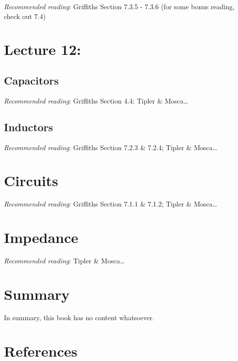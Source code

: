 \documentclass[
  letterpaper,
  DIV=11,
  numbers=noendperiod]{scrreprt}
\newlength{\cslhangindent}
\newenvironment{CSLReferences}[2] %
 {\begin{list}{}{%
  \setlength{\itemindent}{0pt}
  \setlength{\leftmargin}{0pt}
  \setlength{\parsep}{0pt}
  \ifodd #1
   \setlength{\leftmargin}{\cslhangindent}
   \setlength{\itemindent}{-1\cslhangindent}
  \fi
  \setlength{\itemsep}{#2\baselineskip}}}
 {\end{list}}
\begin{document}
\emph{Recommended reading}: Griffiths Section 7.3.5 - 7.3.6 (for some
bonus reading, check out 7.4)


\chapter{Lecture 12:}\label{lecture-12}

\section{Capacitors}\label{capacitors}

\emph{Recommended reading}: Griffiths Section 4.4; Tipler \&
Mosca\ldots{}

\section{Inductors}\label{inductors}

\emph{Recommended reading}: Griffiths Section 7.2.3 \& 7.2.4; Tipler \&
Mosca\ldots{}


\chapter{Circuits}\label{circuits}

\emph{Recommended reading}: Griffiths Section 7.1.1 \& 7.1.2; Tipler \&
Mosca\ldots{}


\chapter{Impedance}\label{impedance}

\emph{Recommended reading}: Tipler \& Mosca\ldots{}


\chapter{Summary}\label{summary-2}

In summary, this book has no content whatsoever.


\chapter*{References}\label{references}


\label{refs}
\begin{CSLReferences}{0}{1}
\end{CSLReferences}
\end{document}
